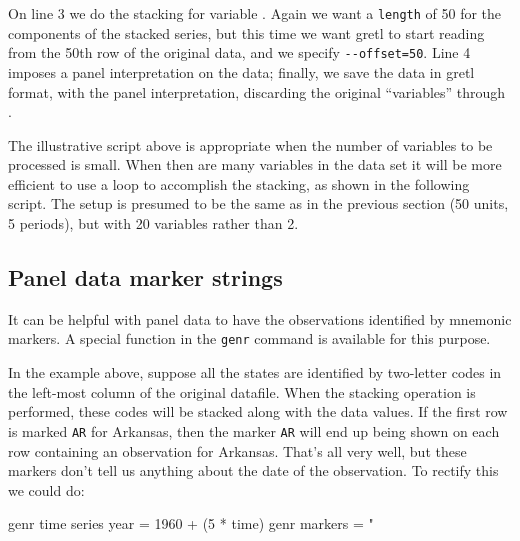 On line 3 we do the stacking for variable .  Again we want
a \texttt{length} of 50 for the components of the stacked series, but
this time we want gretl to start reading from the 50th row of the
original data, and we specify \verb+--offset=50+.
Line 4 imposes a panel interpretation on the data; finally, we save
the data in gretl format, with the panel interpretation, discarding
the original ``variables''  through .

The illustrative script above is appropriate when the number of
variables to be processed is small.  When then are many variables in
the data set it will be more efficient to use a loop to accomplish the
stacking, as shown in the following script.  The setup is presumed to
be the same as in the previous section (50 units, 5 periods), but with
20 variables rather than 2.


\subsection{Panel data marker strings}

It can be helpful with panel data to have the observations identified
by mnemonic markers.  A special function in the \texttt{genr} command
is available for this purpose.

In the example above, suppose all the states are identified by
two-letter codes in the left-most column of the original datafile.
When the stacking operation is performed, these codes will be stacked
along with the data values.  If the first row is marked \texttt{AR}
for Arkansas, then the marker \texttt{AR} will end up being shown on
each row containing an observation for Arkansas.  That's all very
well, but these markers don't tell us anything about the date of the
observation.  To rectify this we could do:

\begin{code}
genr time
series year = 1960 + (5 * time)
genr markers = "%
\end{code}

